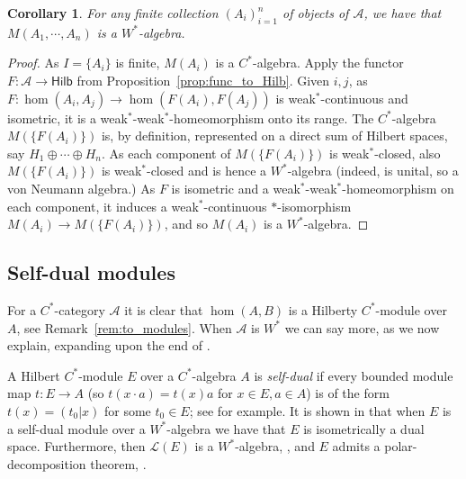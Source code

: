 \documentclass[a4paper,11pt]{article}
\theoremstyle{plain}
\newtheorem{corollary}[proposition]{Corollary}
\theoremstyle{remark}
\newcommand{\mc}[1]{\mathcal{#1}}
\newcommand{\catHilb}{\textsf{Hilb}}
\begin{document}
\begin{corollary}\label{corr:finite_Ai_gives_MA_i_Wstar}
For any finite collection $(A_i)_{i=1}^n$ of objects of $\mc A$, we have that $M(A_1,\cdots,A_n)$ is a $W^*$-algebra.
\end{corollary}
\begin{proof}
As $I = \{ A_i \}$ is finite, $M(A_i)$ is a $C^*$-algebra.  Apply the functor $F\colon \mc A \to \catHilb$ from Proposition~\ref{prop:func_to_Hilb}.  Given $i,j$, as $F\colon\hom(A_i,A_j) \to \hom(F(A_i), F(A_j))$ is weak$^*$-continuous and isometric, it is a weak$^*$-weak$^*$-homeomorphism onto its range.  The $C^*$-algebra $M(\{ F(A_i) \})$ is, by definition, represented on a direct sum of Hilbert spaces, say $H_1\oplus\cdots\oplus H_n$.  As each component of $M(\{ F(A_i) \})$ is weak$^*$-closed, also $M(\{ F(A_i) \})$ is weak$^*$-closed and is hence a $W^*$-algebra (indeed, is unital, so a von Neumann algebra.)  As $F$ is isometric and a weak$^*$-weak$^*$-homeomorphism on each component, it induces a weak$^*$-continuous $*$-isomorphism $M(A_i) \to M(\{ F(A_i) \})$, and so $M(A_i)$ is a $W^*$-algebra.
\end{proof}



\subsection{Self-dual modules}

For a $C^*$-category $\mc A$ it is clear that $\hom(A,B)$ is a Hilberty $C^*$-module over $A$, see Remark~\ref{rem:to_modules}.  When $\mc A$ is $W^*$ we can say more, as we now explain, expanding upon the end of \cite[Section~2]{GLR_Wstar_categories}.

A Hilbert $C^*$-module $E$ over a $C^*$-algebra $A$ is \emph{self-dual} if every bounded module map $t \colon E \to A$ (so $t(x\cdot a) = t(x)a$ for $x\in E, a\in A$) is of the form $t(x) = (t_0|x)$ for some $t_0\in E$; see \cite{paschke_inner_prod_mods} for example.  It is shown in \cite[Proposition~3.8]{paschke_inner_prod_mods} that when $E$ is a self-dual module over a $W^*$-algebra we have that $E$ is isometrically a dual space.  Furthermore, then $\mc L(E)$ is a $W^*$-algebra, \cite[Proposition~3.10]{paschke_inner_prod_mods}, and $E$ admits a polar-decomposition theorem, \cite[Proposition~3.11]{paschke_inner_prod_mods}.
\end{document}

